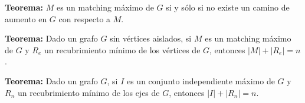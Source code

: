 \textbf{Teorema:} $M$ es un matching m\'aximo de $G$ si y s\'olo si no existe un camino de aumento en $G$ con respecto a $M$.

\textbf{Teorema:} Dado un grafo $G$ sin v\'ertices aislados, si $M$ es un matching m\'aximo de $G$ y $R_e$ un recubrimiento m\'inimo de los v\'ertices de $G$, entonces $|M| + |R_e| = n$.

\textbf{Teorema:} Dado un grafo $G$, si $I$ es un conjunto independiente m\'aximo de $G$ y $R_n$ un recubrimiento m\'inimo de los ejes de $G$, entonces $|I| + |R_n| = n$.